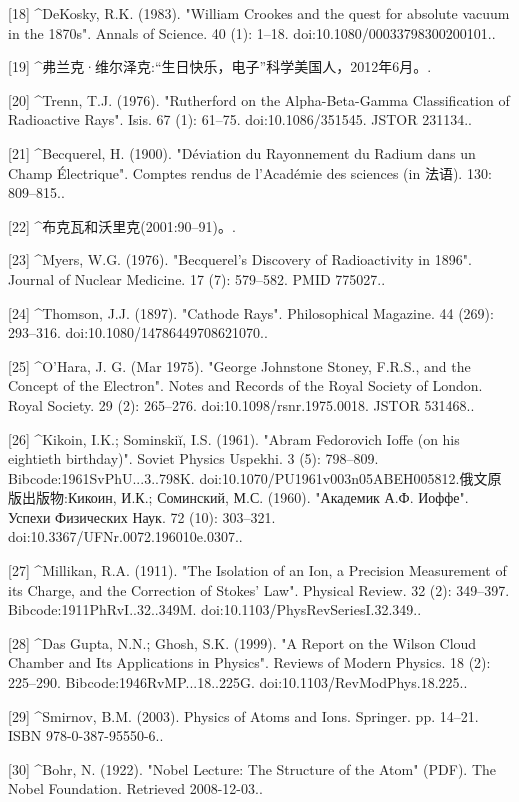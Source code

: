 [18]
^DeKosky, R.K. (1983). "William Crookes and the quest for absolute vacuum in the 1870s". Annals of Science. 40 (1): 1–18. doi:10.1080/00033798300200101..

[19]
^弗兰克·维尔泽克:“生日快乐，电子”科学美国人，2012年6月。.

[20]
^Trenn, T.J. (1976). "Rutherford on the Alpha-Beta-Gamma Classification of Radioactive Rays". Isis. 67 (1): 61–75. doi:10.1086/351545. JSTOR 231134..

[21]
^Becquerel, H. (1900). "Déviation du Rayonnement du Radium dans un Champ Électrique". Comptes rendus de l'Académie des sciences (in 法语). 130: 809–815..

[22]
^布克瓦和沃里克(2001:90–91)。.

[23]
^Myers, W.G. (1976). "Becquerel's Discovery of Radioactivity in 1896". Journal of Nuclear Medicine. 17 (7): 579–582. PMID 775027..

[24]
^Thomson, J.J. (1897). "Cathode Rays". Philosophical Magazine. 44 (269): 293–316. doi:10.1080/14786449708621070..

[25]
^O'Hara, J. G. (Mar 1975). "George Johnstone Stoney, F.R.S., and the Concept of the Electron". Notes and Records of the Royal Society of London. Royal Society. 29 (2): 265–276. doi:10.1098/rsnr.1975.0018. JSTOR 531468..

[26]
^Kikoin, I.K.; Sominskiĭ, I.S. (1961). "Abram Fedorovich Ioffe (on his eightieth birthday)". Soviet Physics Uspekhi. 3 (5): 798–809. Bibcode:1961SvPhU...3..798K. doi:10.1070/PU1961v003n05ABEH005812.俄文原版出版物:Кикоин, И.К.; Соминский, М.С. (1960). "Академик А.Ф. Иоффе". Успехи Физических Наук. 72 (10): 303–321. doi:10.3367/UFNr.0072.196010e.0307..

[27]
^Millikan, R.A. (1911). "The Isolation of an Ion, a Precision Measurement of its Charge, and the Correction of Stokes' Law". Physical Review. 32 (2): 349–397. Bibcode:1911PhRvI..32..349M. doi:10.1103/PhysRevSeriesI.32.349..

[28]
^Das Gupta, N.N.; Ghosh, S.K. (1999). "A Report on the Wilson Cloud Chamber and Its Applications in Physics". Reviews of Modern Physics. 18 (2): 225–290. Bibcode:1946RvMP...18..225G. doi:10.1103/RevModPhys.18.225..

[29]
^Smirnov, B.M. (2003). Physics of Atoms and Ions. Springer. pp. 14–21. ISBN 978-0-387-95550-6..

[30]
^Bohr, N. (1922). "Nobel Lecture: The Structure of the Atom" (PDF). The Nobel Foundation. Retrieved 2008-12-03..

